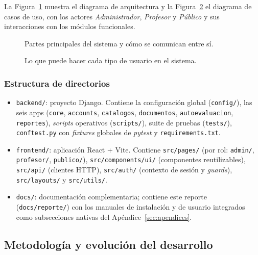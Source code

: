La Figura~\ref{fig:arquitectura} muestra el diagrama de arquitectura y la Figura~\ref{fig:casos_uso} el diagrama de casos de uso, con los actores \emph{Administrador}, \emph{Profesor} y \emph{Público} y sus interacciones con los módulos funcionales.

\begin{figure}[!htbp]
    \centering
    
    \caption{Partes principales del sistema y cómo se comunican entre sí.}
    \label{fig:arquitectura}
\end{figure}

\begin{figure}[!htbp]
    \centering
    \resizebox{0.95\textwidth}{!}{}
    \caption{Lo que puede hacer cada tipo de usuario en el sistema.}
    \label{fig:casos_uso}
\end{figure}

\subsubsection{Estructura de directorios}

\begin{itemize}
    \item \texttt{backend/}: proyecto Django. Contiene la configuración global (\texttt{config/}), las seis apps (\texttt{core}, \texttt{accounts}, \texttt{catalogos}, \texttt{documentos}, \texttt{autoevaluacion}, \texttt{reportes}), \emph{scripts} operativos (\texttt{scripts/}), suite de pruebas (\texttt{tests/}), \texttt{conftest.py} con \emph{fixtures} globales de \emph{pytest} y \texttt{requirements.txt}.
    \item \texttt{frontend/}: aplicación React + Vite. Contiene \texttt{src/pages/} (por rol: \texttt{admin/}, \texttt{profesor/}, \texttt{publico/}), \texttt{src/components/ui/} (componentes reutilizables), \texttt{src/api/} (clientes HTTP), \texttt{src/auth/} (contexto de sesión y \emph{guards}), \texttt{src/layouts/} y \texttt{src/utils/}.
    \item \texttt{docs/}: documentación complementaria; contiene este reporte (\texttt{docs/reporte/}) con los manuales de instalación y de usuario integrados como subsecciones nativas del Apéndice~\ref{sec:apendices}.
\end{itemize}

\subsection{Metodología y evolución del desarrollo}\label{subsec:metodologia-desarrollo}

